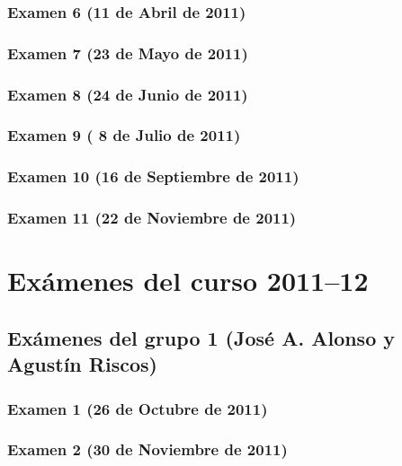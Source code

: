 \documentclass[a4paper,12pt,twoside]{book}
\begin{document}
\subsection{Examen 6 (11 de Abril de 2011)}
\subsection{Examen 7 (23 de Mayo de 2011)}
\subsection{Examen 8 (24 de Junio de 2011)} 
\label{examen_10_11_4_8}
\subsection{Examen 9 ( 8 de Julio de 2011)} 
\label{examen_10_11_4_9}
\subsection{Examen 10 (16 de Septiembre de 2011)} 
\label{examen_10_11_4_10}
\subsection{Examen 11 (22 de Noviembre de 2011)} 
\label{examen_10_11_4_11}

\chapter{Exámenes del curso 2011--12}

\section{Exámenes del grupo 1 (José A. Alonso y Agustín Riscos)}
\subsection{Examen 1 (26 de Octubre de 2011)}
\subsection{Examen 2 (30 de Noviembre de 2011)}
\end{document}
